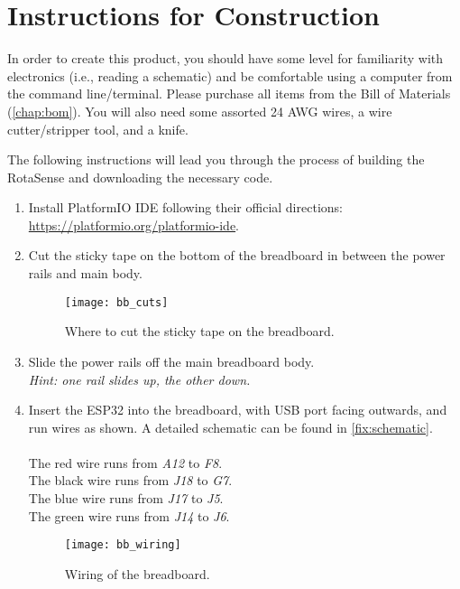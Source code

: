 \chapter{Instructions for Construction}
\label{chap:construction}

In order to create this product, you should have some level for familiarity
with electronics (i.e., reading a schematic) and be comfortable using a
computer from the command line/terminal. Please purchase all items from the
Bill of Materials (\autoref{chap:bom}). You will also need some assorted 24 AWG
wires, a wire cutter/stripper tool, and a knife.

The following instructions will lead you through the process of building the
RotaSense and downloading the necessary code.

\begin{enumerate}
\item Install PlatformIO IDE following their official directions:
  \href{https://platformio.org/platformio-ide}{https://platformio.org/platformio-ide}.
  
\item Cut the sticky tape on the bottom of the breadboard in between the power
  rails and main body.
  \begin{figure}[H]
    \centering
    \texttt{[image: bb\_cuts]}
    \caption{Where to cut the sticky tape on the breadboard.}
    \label{fig:bb-cuts}
  \end{figure}
  
\item Slide the power rails off the main breadboard body.\\
  \textit{Hint: one rail slides up, the other down.}
  
\item Insert the ESP32 into the breadboard, with USB port facing outwards, and
  run wires as shown. A detailed schematic can be found in \autoref{fix:schematic}.\\
  \\
  The red wire runs from \textit{A12} to \textit{F8}.\\
  The black wire runs from \textit{J18} to \textit{G7}.\\
  The blue wire runs from \textit{J17} to \textit{J5}.\\
  The green wire runs from \textit{J14} to \textit{J6}.
  \begin{figure}[H]
    \centering
    \texttt{[image: bb\_wiring]}
    \caption{Wiring of the breadboard.}
  \end{figure}
  

\end{enumerate}
